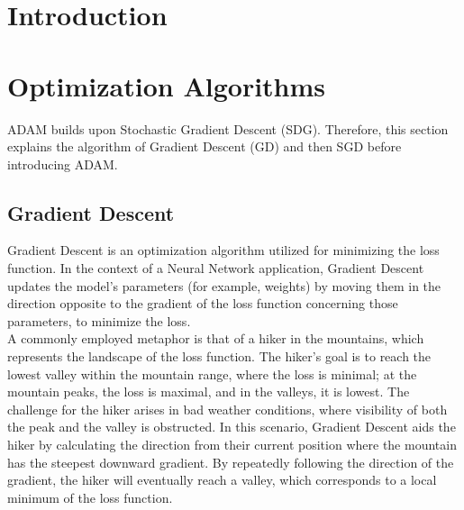 \documentclass[oneside]{article}
\begin{document}
\tableofcontents 
\vspace{1.5cm}


\newpage
\section{Introduction}



\section{Optimization Algorithms}
ADAM builds upon Stochastic Gradient Descent (SDG). Therefore, this section explains the algorithm of Gradient Descent (GD) and then SGD before introducing ADAM.
\subsection{Gradient Descent}
Gradient Descent is an optimization algorithm utilized for minimizing the loss function. In the context of a Neural Network application, Gradient Descent updates the model's parameters (for example, weights) by moving them in the direction opposite to the gradient of the loss function concerning those parameters, to minimize the loss.  \\
A commonly employed metaphor is that of a hiker in the mountains, which represents the landscape of the loss function. The hiker's goal is to reach the lowest valley within the mountain range, where the loss is minimal; at the mountain peaks, the loss is maximal, and in the valleys, it is lowest. The challenge for the hiker arises in bad weather conditions, where visibility of both the peak and the valley is obstructed. In this scenario, Gradient Descent aids the hiker by calculating the direction from their current position where the mountain has the steepest downward gradient. By repeatedly following the direction of the gradient, the hiker will eventually reach a valley, which corresponds to a local minimum of the loss function. \\
\end{document}
